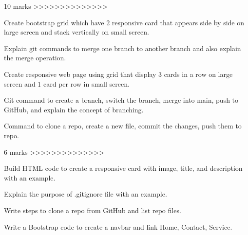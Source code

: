 10 marks >>>>>>>>>>>>>>

Create bootstrap grid which have 2 responsive card that appears side by side on large screen and stack vertically on small screen.

Explain git commands to merge one branch to another branch and also explain the merge operation.

Create responsive web page using grid that display 3 cards in a row on large screen and 1 card per row in small screen.

Git command to create a branch, switch the branch, merge into main, push to GitHub, and explain the concept of branching.

Command to clone a repo, create a new file, commit the changes, push them to repo.

6 marks >>>>>>>>>>>>>>

Build HTML code to create a responsive card with image, title, and description with an example.

Explain the purpose of .gitignore file with an example.

Write steps to clone a repo from GitHub and list repo files.

Write a Bootstrap code to create a navbar and link Home, Contact, Service.